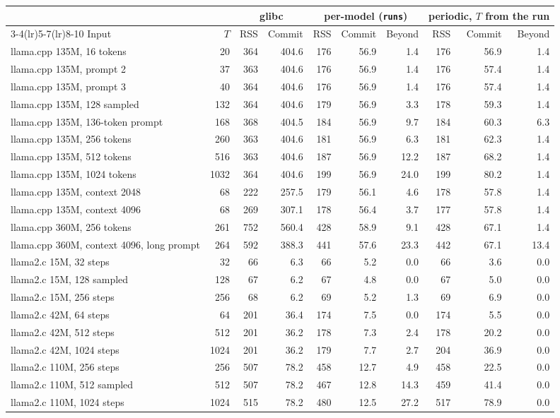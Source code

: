 \begin{tabular}{lrrrrrrrrr}
\toprule
 & & \multicolumn{2}{c}{glibc} & \multicolumn{3}{c}{per-model (\texttt{runs})} & \multicolumn{3}{c}{periodic, $T$ from the run} \\
\cmidrule(lr){3-4}\cmidrule(lr){5-7}\cmidrule(lr){8-10}
Input & $T$ & RSS & Commit & RSS & Commit & Beyond & RSS & Commit & Beyond \\
\midrule
llama.cpp 135M, 16 tokens & 20 & 364 & 404.6 & 176 & 56.9 & 1.4 & 176 & 56.9 & 1.4 \\
llama.cpp 135M, prompt 2 & 37 & 363 & 404.6 & 176 & 56.9 & 1.4 & 176 & 57.4 & 1.4 \\
llama.cpp 135M, prompt 3 & 40 & 364 & 404.6 & 176 & 56.9 & 1.4 & 176 & 57.4 & 1.4 \\
llama.cpp 135M, 128 sampled & 132 & 364 & 404.6 & 179 & 56.9 & 3.3 & 178 & 59.3 & 1.4 \\
llama.cpp 135M, 136-token prompt & 168 & 368 & 404.5 & 184 & 56.9 & 9.7 & 184 & 60.3 & 6.3 \\
llama.cpp 135M, 256 tokens & 260 & 363 & 404.6 & 181 & 56.9 & 6.3 & 181 & 62.3 & 1.4 \\
llama.cpp 135M, 512 tokens & 516 & 363 & 404.6 & 187 & 56.9 & 12.2 & 187 & 68.2 & 1.4 \\
llama.cpp 135M, 1024 tokens & 1032 & 364 & 404.6 & 199 & 56.9 & 24.0 & 199 & 80.2 & 1.4 \\
llama.cpp 135M, context 2048 & 68 & 222 & 257.5 & 179 & 56.1 & 4.6 & 178 & 57.8 & 1.4 \\
llama.cpp 135M, context 4096 & 68 & 269 & 307.1 & 178 & 56.4 & 3.7 & 177 & 57.8 & 1.4 \\
llama.cpp 360M, 256 tokens & 261 & 752 & 560.4 & 428 & 58.9 & 9.1 & 428 & 67.1 & 1.4 \\
llama.cpp 360M, context 4096, long prompt & 264 & 592 & 388.3 & 441 & 57.6 & 23.3 & 442 & 67.1 & 13.4 \\
\midrule
llama2.c 15M, 32 steps & 32 & 66 & 6.3 & 66 & 5.2 & 0.0 & 66 & 3.6 & 0.0 \\
llama2.c 15M, 128 sampled & 128 & 67 & 6.2 & 67 & 4.8 & 0.0 & 67 & 5.0 & 0.0 \\
llama2.c 15M, 256 steps & 256 & 68 & 6.2 & 69 & 5.2 & 1.3 & 69 & 6.9 & 0.0 \\
llama2.c 42M, 64 steps & 64 & 201 & 36.4 & 174 & 7.5 & 0.0 & 174 & 5.5 & 0.0 \\
llama2.c 42M, 512 steps & 512 & 201 & 36.2 & 178 & 7.3 & 2.4 & 178 & 20.2 & 0.0 \\
llama2.c 42M, 1024 steps & 1024 & 201 & 36.2 & 179 & 7.7 & 2.7 & 204 & 36.9 & 0.0 \\
llama2.c 110M, 256 steps & 256 & 507 & 78.2 & 458 & 12.7 & 4.9 & 458 & 22.5 & 0.0 \\
llama2.c 110M, 512 sampled & 512 & 507 & 78.2 & 467 & 12.8 & 14.3 & 459 & 41.4 & 0.0 \\
llama2.c 110M, 1024 steps & 1024 & 515 & 78.2 & 480 & 12.5 & 27.2 & 517 & 78.9 & 0.0 \\
\bottomrule
\end{tabular}

